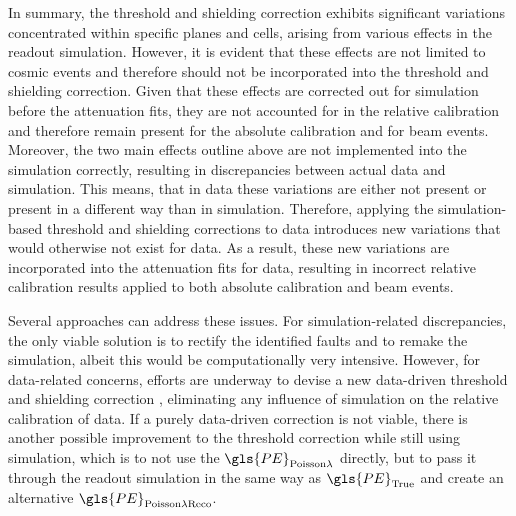 In summary, the threshold and shielding correction exhibits significant variations concentrated within specific planes and cells, arising from various effects in the readout simulation. However, it is evident that these effects are not limited to cosmic events and therefore should not be incorporated into the threshold and shielding correction. Given that these effects are corrected out for simulation before the attenuation fits, they are not accounted for in the relative calibration and therefore remain present for the absolute calibration and for beam events. Moreover, the two main effects outline above are not implemented into the simulation correctly, resulting in discrepancies between actual data and simulation. This means, that in data these variations are either not present or present in a different way than in simulation. Therefore, applying the simulation-based threshold and shielding corrections to data introduces new variations that would otherwise not exist for data. As a result, these new variations are incorporated into the attenuation fits for data, resulting in incorrect relative calibration results applied to both absolute calibration and beam events.

Several approaches can address these issues. For simulation-related discrepancies, the only viable solution is to rectify the identified faults and to remake the simulation, albeit this would be computationally very intensive. However, for data-related concerns, efforts are underway to devise a new data-driven threshold and shielding correction \cite{NOvA-doc-15223}, eliminating any influence of simulation on the relative calibration of data. If a purely data-driven correction is not viable, there is another possible improvement to the threshold correction while still using simulation, which is to not use the $\gls{PE}_{\mathrm{Poisson}\lambda}$ directly, but to pass it through the readout simulation in the same way as $\gls{PE}_{\mathrm{True}}$ and create an alternative $\gls{PE}_{\mathrm{Poisson}\lambda\mathrm{Reco}}$.

